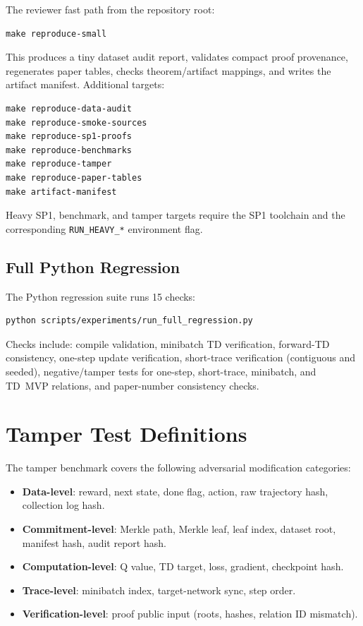 The reviewer fast path from the repository root:
{\scriptsize
\begin{verbatim}
make reproduce-small
\end{verbatim}
}
\noindent This produces a tiny dataset audit report, validates compact proof
provenance, regenerates paper tables, checks theorem/artifact mappings, and
writes the artifact manifest. Additional targets:
{\scriptsize
\begin{verbatim}
make reproduce-data-audit
make reproduce-smoke-sources
make reproduce-sp1-proofs
make reproduce-benchmarks
make reproduce-tamper
make reproduce-paper-tables
make artifact-manifest
\end{verbatim}
}
\noindent Heavy SP1, benchmark, and tamper targets require the SP1 toolchain
and the corresponding \texttt{RUN\_HEAVY\_*} environment flag.

\subsection{Full Python Regression}

The Python regression suite runs 15 checks:
{\scriptsize
\begin{verbatim}
python scripts/experiments/run_full_regression.py
\end{verbatim}
}
\noindent Checks include: compile validation, minibatch TD verification,
forward-TD consistency, one-step update verification, short-trace verification
(contiguous and seeded), negative/tamper tests for one-step, short-trace,
minibatch, and TD~MVP relations, and paper-number consistency checks.

\section{Tamper Test Definitions}
\label{app:tamper-tests}

The tamper benchmark covers the following adversarial modification categories:

\begin{itemize}[leftmargin=1.5em]
  \item \textbf{Data-level}: reward, next state, done flag, action, raw
  trajectory hash, collection log hash.
  \item \textbf{Commitment-level}: Merkle path, Merkle leaf, leaf index,
  dataset root, manifest hash, audit report hash.
  \item \textbf{Computation-level}: Q value, TD target, loss, gradient,
  checkpoint hash.
  \item \textbf{Trace-level}: minibatch index, target-network sync, step
  order.
  \item \textbf{Verification-level}: proof public input (roots, hashes,
  relation ID mismatch).
\end{itemize}

